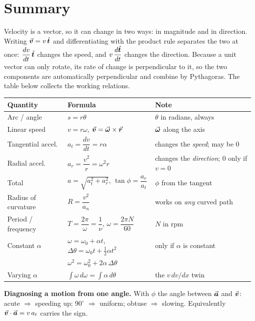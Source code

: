 \section{Summary}\label{sec:summary6}
Velocity is a vector, so it can change in two ways: in magnitude and in direction. Writing $\vec{\bm{v}}=v\,\hat{\bm{t}}$ and differentiating with the product rule separates the two at once:
$\dfrac{dv}{dt}\,\hat{\bm{t}}$ changes the speed, and $v\,\dfrac{d\hat{\bm{t}}}{dt}$ changes the direction. Because a unit vector can only rotate,
its rate of change is perpendicular to it, so the two components are automatically perpendicular and
combine by Pythagoras. The table below collects the working relations.

\medskip
{\small\renewcommand{\arraystretch}{1.45}
\begin{center}
\begin{tabular}{@{}lll@{}}
\toprule
Quantity & Formula & Note\\
\midrule
Arc / angle        & $s=r\theta$                                   & $\theta$ in radians, always\\
Linear speed       & $v=r\omega$, \; $\vec{\bm{v}}=\vec{\bm{\omega}}\times\vec{\bm{r}}$           & $\vec{\bm{\omega}}$ along the axis\\
Tangential accel.  & $a_t=\dfrac{dv}{dt}=r\alpha$                  & changes the \emph{speed}; may be $0$\\
Radial accel.      & $a_r=\dfrac{v^{2}}{r}=\omega^{2}r$            & changes the \emph{direction}; $0$ only if $v=0$\\
Total              & $a=\sqrt{a_t^{2}+a_r^{2}}$, \; $\tan\phi=\dfrac{a_r}{a_t}$ & $\phi$ from the tangent\\
Radius of curvature& $R=\dfrac{v^{2}}{a_n}$                        & works on \emph{any} curved path\\
Period / frequency & $T=\dfrac{2\pi}{\omega}=\dfrac1\nu$, \; $\omega=\dfrac{2\pi N}{60}$ & $N$ in rpm\\
Constant $\alpha$  & $\omega=\omega_0+\alpha t$,\; $\Delta\theta=\omega_0t+\tfrac12\alpha t^{2}$ & only if $\alpha$ is constant\\
                   & $\omega^{2}=\omega_0^{2}+2\alpha\,\Delta\theta$ & \\
Varying $\alpha$   & $\displaystyle\int\omega\,d\omega=\int\alpha\,d\theta$ & the $v\,dv/dx$ twin\\
\bottomrule
\end{tabular}
\end{center}
}

\medskip
\textbf{Diagnosing a motion from one angle.} With $\phi$ the angle between $\vec{\bm{a}}$ and $\vec{\bm{v}}$:
acute $\Rightarrow$ speeding up; $90^\circ$ $\Rightarrow$ uniform; obtuse $\Rightarrow$ slowing.
Equivalently $\vec{\bm{v}}\cdot\vec{\bm{a}}=v\,a_t$ carries the sign.

